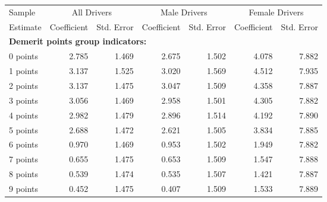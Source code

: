 
\begin{table}%
\centering 
\begin{tabular}{l r r r r r r} 

\hline 
 

Sample 
 & \multicolumn{2}{c}{All  Drivers}  & \multicolumn{2}{c}{Male  Drivers}  & \multicolumn{2}{c}{Female  Drivers}   \\ 
 

 \cmidrule(lr){1-1}\cmidrule(lr){2-3}\cmidrule(lr){4-5}\cmidrule(lr){6-7} 

Estimate  & Coefficient & Std. Error  & Coefficient & Std. Error  & Coefficient & Std. Error   \\ 
 

\hline 
 
\multicolumn{4}{l}{\textbf{Demerit points group indicators:}}  \\ 
 
0 points  &  2.785  &  1.469  &  2.675  &  1.502  &  4.078  &  7.882   \\ 
 
1 points  &  3.137  &  1.525  &  3.020  &  1.569  &  4.512  &  7.935   \\ 
 
2 points  &  3.137  &  1.475  &  3.047  &  1.509  &  4.358  &  7.887   \\ 
 
3 points  &  3.056  &  1.469  &  2.958  &  1.501  &  4.305  &  7.882   \\ 
 
4 points  &  2.982  &  1.479  &  2.896  &  1.514  &  4.192  &  7.890   \\ 
 
5 points  &  2.688  &  1.472  &  2.621  &  1.505  &  3.834  &  7.885   \\ 
 
6 points  &  0.970  &  1.469  &  0.953  &  1.502  &  1.949  &  7.882   \\ 
 
7 points  &  0.655  &  1.475  &  0.653  &  1.509  &  1.547  &  7.888   \\ 
 
8 points  &  0.539  &  1.474  &  0.535  &  1.507  &  1.421  &  7.887   \\ 
 
9 points  &  0.452  &  1.475  &  0.407  &  1.509  &  1.533  &  7.889   \\ 
 

\end{tabular}
\end{table}

